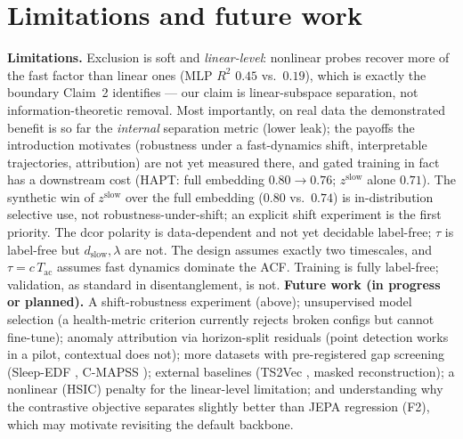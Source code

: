 \documentclass[10pt,twocolumn]{article}
\begin{document}
\section{Limitations and future work}
\textbf{Limitations.} Exclusion is soft and \emph{linear-level}: nonlinear
probes recover more of the fast factor than linear ones (MLP $R^2$ $0.45$
vs.\ $0.19$), which is exactly the boundary Claim~2 identifies --- our claim
is linear-subspace separation, not information-theoretic removal. Most importantly, on real data the demonstrated benefit is so far the
\emph{internal} separation metric (lower leak); the payoffs the introduction
motivates (robustness under a fast-dynamics shift, interpretable
trajectories, attribution) are not yet measured there, and gated training in
fact has a downstream cost (HAPT: full embedding $0.80\!\to\!0.76$;
$z^{\mathrm{slow}}$ alone $0.71$). The synthetic win of $z^{\mathrm{slow}}$
over the full embedding ($0.80$ vs.\ $0.74$) is in-distribution selective
use, not robustness-under-shift; an explicit shift experiment is the first
priority. The dcor polarity is data-dependent and not yet
decidable label-free; $\tau$ is label-free but
$d_{\mathrm{slow}},\lambda$ are not. The design assumes exactly two
timescales, and $\tau=c\,T_{\mathrm{ac}}$ assumes fast dynamics dominate the
ACF. Training is fully label-free; validation, as standard in
disentanglement, is not.
\textbf{Future work (in progress or planned).} A shift-robustness experiment
(above); unsupervised model selection (a health-metric criterion currently
rejects broken configs but cannot fine-tune); anomaly attribution via
horizon-split residuals (point detection works in a pilot, contextual does
not); more datasets with pre-registered gap screening (Sleep-EDF
\cite{kemp2000analysis}, C-MAPSS \cite{saxena2008damage}); external baselines
(TS2Vec \cite{yue2022ts2vec}, masked reconstruction); a nonlinear (HSIC)
penalty for the linear-level limitation; and understanding why the contrastive
objective separates slightly better than JEPA regression (F2), which may
motivate revisiting the default backbone.
\end{document}
